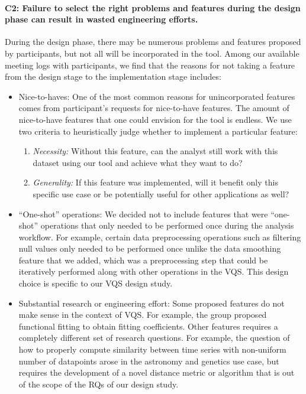 {\paragraph{C2: Failure to select the right problems and features during the design phase can result in wasted engineering efforts.}
\par During the design phase, there may be numerous problems and features proposed by participants, but not all will be incorporated in the tool. Among our available meeting logs with participants, we find that the reasons for not taking a feature from the design stage to the implementation stage includes: 
\begin{itemize}
\item Nice-to-haves: One of the most common reasons for unincorporated features comes from participant's requests for nice-to-have features. The amount of nice-to-have features that one could envision for the tool is endless. We use 
two criteria to heuristically judge whether to implement a particular feature:
\begin{enumerate}
\item \textit{Necessity:} Without this feature, can the analyst still work with this dataset using our tool and achieve what they want to do? 
\item \textit{Generality:} If this feature was implemented, will it benefit only this specific use case or be potentially useful for other applications as well?
\end{enumerate}
\item ``One-shot'' operations: We decided not to include features that were ``one-shot'' operations that only needed to be performed once during the analysis workflow. For example, certain data preprocessing operations such as filtering null values only needed to be performed once unlike the data smoothing feature that we added, which was a preprocessing step that could be iteratively performed along with other operations in the VQS. This design choice is specific to our VQS design study.
\item Substantial research or engineering effort: Some proposed features do not make sense in the context of VQS. For example, the \matsci group proposed functional fitting to obtain fitting coefficients. Other features requires a completely different set of research questions. For example, the question of how to properly compute similarity between time series with non-uniform number of datapoints arose in the astronomy and genetics use case, but requires the development of a novel distance metric or algorithm that is out of the scope of the RQs of our design study.

\end{itemize}}

